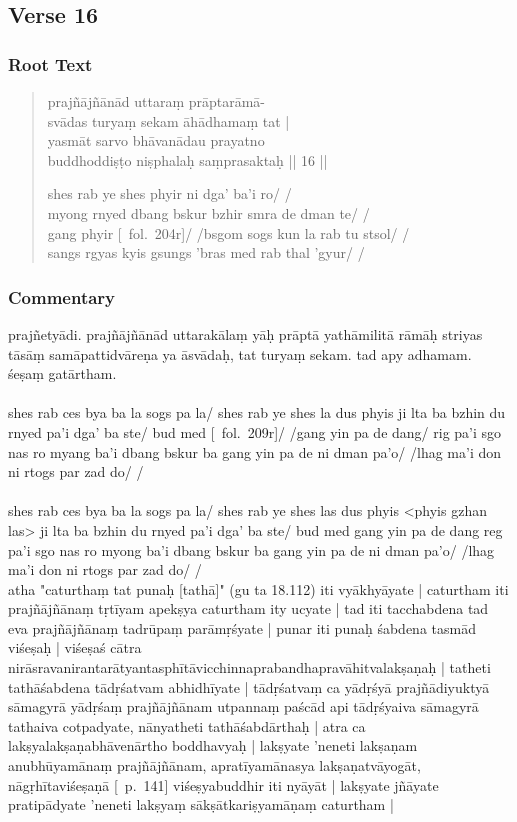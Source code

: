 \documentclass[12pt]{article}
\begin{document}
\subsection{Verse 16}
\subsubsection{Root Text}
\begin{quote}
	prajñājñānād uttaraṃ prāptarāmā-\\
	svādas turyaṃ sekam āhādhamaṃ tat |\\
	yasmāt sarvo bhāvanādau prayatno \\
	buddhoddiṣṭo niṣphalaḥ saṃprasaktaḥ || 16 ||

	shes rab ye shes phyir ni dga' ba'i ro/ /\\
	myong rnyed dbang bskur bzhir smra de dman te/ /\\
	gang phyir [\TM\ fol.\ 204r]/ /bsgom sogs kun la rab tu stsol/ /\\
	sangs rgyas kyis gsungs 'bras med rab thal 'gyur/ /
\end{quote}

\subsubsection{Commentary}
prajñetyādi.
prajñājñānād uttarakālaṃ yāḥ prāptā yathāmilitā rāmāḥ striyas tāsāṃ samāpattidvāreṇa ya āsvādaḥ, tat turyaṃ sekam.
tad apy adhamam.
śeṣaṃ gatārtham.\\

\textbf{\TVA}\\
shes rab ces bya ba la sogs pa la/ shes rab ye shes la dus phyis ji lta ba bzhin du rnyed pa'i dga' ba ste/ bud med [\TVA\ fol.\ 209r]/ /gang yin pa de dang/ rig pa'i sgo nas ro myang ba'i dbang bskur ba gang yin pa de ni dman pa'o/ /lhag ma'i don ni rtogs par zad do/ /\\

\textbf{\TVB}\\
shes rab ces bya ba la sogs pa la/ shes rab ye shes las dus phyis <phyis gzhan las> ji lta ba bzhin du rnyed pa'i dga' ba ste/ bud med gang yin pa de dang reg pa'i sgo nas ro myong ba'i dbang bskur ba gang yin pa de ni dman pa'o/ /lhag ma'i don ni rtogs par zad do/ /\\

atha "caturthaṃ tat punaḥ [tathā]" (gu ta 18.112) iti vyākhyāyate | caturtham iti prajñājñānaṃ tṛtīyam apekṣya caturtham ity ucyate | tad iti tacchabdena tad eva prajñājñānaṃ tadrūpaṃ parāmṛśyate | punar iti punaḥ śabdena tasmād viśeṣaḥ | viśeṣaś cātra nirāsravanirantarātyantasphītāvicchinnaprabandhapravāhitvalakṣaṇaḥ | tatheti tathāśabdena tādṛśatvam abhidhīyate | tādṛśatvaṃ ca yādṛśyā prajñādiyuktyā sāmagyrā yādṛśaṃ prajñājñānam utpannaṃ paścād api tādṛśyaiva sāmagyrā tathaiva cotpadyate, nānyatheti tathāśabdārthaḥ | atra ca lakṣyalakṣaṇabhāvenārtho boddhavyaḥ | lakṣyate 'neneti lakṣaṇam anubhūyamānaṃ prajñājñānam, apratīyamānasya lakṣaṇatvāyogāt, nāgṛhītaviśeṣaṇā [\EDD\ p.\ 141] viśeṣyabuddhir iti nyāyāt | lakṣyate jñāyate pratipādyate 'neneti lakṣyaṃ sākṣātkariṣyamāṇaṃ caturtham |\\
\end{document}
